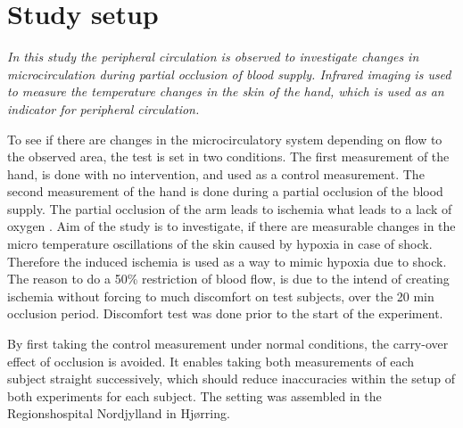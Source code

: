 \chapter{Study setup}

\textit{In this study the peripheral circulation is observed to investigate changes in microcirculation during partial occlusion of blood supply. Infrared imaging is used to measure the temperature changes in the skin of the hand, which is used as an indicator for peripheral circulation.} 


To see if there are changes in the microcirculatory system depending on flow to the observed area, the test is set in two conditions. The first measurement of the hand, is done with no intervention, and used as a control measurement. The second measurement of the hand is done during a partial occlusion of the blood supply. The partial occlusion of the arm leads to ischemia what leads to a lack of oxygen \cite{martini2012}. Aim of the study is to investigate, if there are measurable changes in the micro temperature oscillations of the skin caused by hypoxia in case of shock. Therefore the induced ischemia is used as a way to mimic hypoxia due to shock.
The reason to do a 50\% restriction of blood flow, is due to the intend of creating ischemia without forcing to much discomfort on test subjects, over the 20 min occlusion period. Discomfort test was done prior to the start of the experiment.

By first taking the control measurement under normal conditions, the carry-over effect of occlusion is avoided. It enables taking both measurements of each subject straight successively, which should reduce inaccuracies within the setup of both experiments for each subject. The setting was assembled in the Regionshospital Nordjylland in Hj\o{}rring.